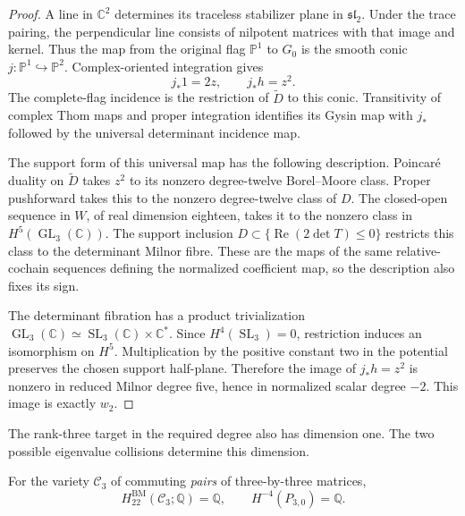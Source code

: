 \begin{proof}
A line in $\mathbb C^2$ determines its traceless stabilizer plane
in $\mathfrak{sl}_2$. Under the trace pairing, the perpendicular
line consists of nilpotent matrices with that image and kernel.
Thus the map from the original flag $\mathbb P^1$ to $G_0$
is the smooth conic $j:\mathbb P^1\hookrightarrow\mathbb P^2$.
Complex-oriented integration gives
\[
 j_*1=2z,\qquad j_*h=z^2.
\]
The complete-flag incidence is the restriction of $\widetilde D$
to this conic. Transitivity of complex Thom maps and proper
integration identifies its Gysin map with $j_*$ followed by the
universal determinant incidence map.

The support form of this universal map has the following description.
Poincar\'e duality on $\widetilde D$ takes $z^2$ to its nonzero
degree-twelve Borel--Moore class. Proper pushforward takes this to
the nonzero degree-twelve class of $D$.
The closed-open sequence in $W$, of real dimension eighteen,
takes it to the nonzero class in $H^5(\operatorname{GL}_3(\mathbb C))$.
The support inclusion
$D\subset\{\operatorname{Re}(2\det T)\leq0\}$ restricts this
class to the determinant Milnor fibre.
These are the maps of the same relative-cochain sequences defining
the normalized coefficient map, so the description also fixes its sign.

The determinant fibration has a product trivialization
$\operatorname{GL}_3(\mathbb C)\simeq
 \operatorname{SL}_3(\mathbb C)\times\mathbb C^*$.
Since $H^4(\operatorname{SL}_3)=0$, restriction induces an isomorphism
on $H^5$. Multiplication by the positive constant two in the
potential preserves the chosen support half-plane.
Therefore the image of $j_*h=z^2$ is nonzero in reduced Milnor
degree five, hence in normalized scalar degree $-2$.
This image is exactly $w_2$.
\end{proof}

The rank-three target in the required degree also has dimension one.
The two possible eigenvalue collisions determine this dimension.

\begin{lemma}
\label{sch:lem:rank-three-bm}
For the variety $\mathcal C_3$ of commuting \emph{pairs} of
three-by-three matrices,
\[
 H^{\mathrm{BM}}_{22}(\mathcal C_3;\mathbb Q)=\mathbb Q,
 \qquad H^{-4}(P_{3,0})=\mathbb Q.
\]
\end{lemma}

